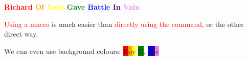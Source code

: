 \documentclass[letterpaper]{article}
\newcommand{\red}[1]{\textcolor{red}{#1}}
\newcommand{\orange}[1]{\textcolor{orange}{#1}}
\newcommand{\yellow}[1]{\textcolor{yellow}{#1}}
\newcommand{\green}[1]{\textcolor{green}{#1}}
\newcommand{\blue}[1]{\textcolor{blue}{#1}}
\newcommand{\indigo}[1]{\textcolor{indigo}{#1}}
\newcommand{\violet}[1]{\textcolor{violet}{#1}}
\newcommand{\redbg}[1]{\colorbox{red}{#1}}
\newcommand{\orangebg}[1]{\colorbox{orange}{#1}}
\newcommand{\yellowbg}[1]{\colorbox{yellow}{#1}}
\newcommand{\greenbg}[1]{\colorbox{green}{#1}}
\newcommand{\bluebg}[1]{\colorbox{blue}{#1}}
\newcommand{\indigobg}[1]{\colorbox{indigo}{#1}}
\newcommand{\violetbg}[1]{\colorbox{violet}{#1}}
\begin{document}
\textbf{
\red{Richard} \orange{Of} \yellow{York} \green{Gave} \blue{Battle} \indigo{In}
\violet{Vain}
}

\red{Using a macro} is much easier than \textcolor{red}{directly using the
command}, or the {\color{red}other direct way}.

We can even use background colours: \redbg{R}\orangebg{o}\yellowbg{y}
\greenbg{G}. \bluebg{B}\indigobg{i}\violetbg{v}
\end{document}
